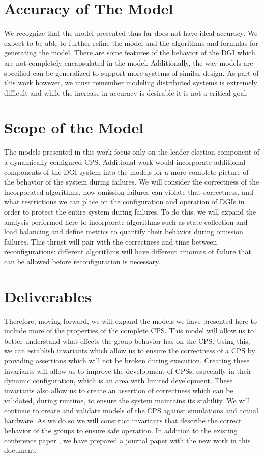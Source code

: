 \section{Accuracy of The Model}

We recognize that the model presented thus far does not have ideal accuracy. We expect to be able to further refine the model and the algorithms and formulas for generating the model. There are some features of the behavior of the DGI which are not completely encapsulated in the model. Additionally, the way models are specified can be generalized to support more systems of similar design. As part of this work however, we must remember modeling distributed systems is extremely difficult and while the increase in accuracy is desirable it is not a critical goal.

\section{Scope of the Model}

The models presented in this work focus only on the leader election component of a dynamically configured CPS. Additional work would incorporate additional components of the DGI system into the models for a more complete picture of the behavior of the system during failures. We will consider the correctness of the incorporated algorithms, how omission failures can violate that correctness, and what restrictions we can place on the configuration and operation of DGIs in order to protect the entire system during failures. To do this, we will expand the analysis performed here to incorporate algorithms such as state collection and load balancing and define metrics to quantify their behavior during omission failures. This thrust will pair with the correctness and time between reconfigurations: different algorithms will have different amounts of failure that can be allowed before reconfiguration is necessary.

\section{Deliverables}

Therefore, moving forward, we will expand the models we have presented here to include more of the properties of the complete CPS. This model will allow us to better understand what effects the group behavior has on the CPS. Using this, we can establish invariants which allow us to ensure the correctness of a CPS by providing assertions which will not be broken during execution. Creating these invariants will allow us to improve the development of CPSs, especially in their dynamic configuration, which is an area with limited development. These invariants also allow us to create an assertion of correctness which can be validated, during runtime, to ensure the system maintains its stability. We will continue to create and validate models of the CPS against simulations and actual hardware. As we do so we will construct invariants that describe the correct behavior of the groups to ensure safe operation. In addition to the existing conference paper \cite{CRITIS2012}, we have prepared a journal paper with the new work in this document. 
